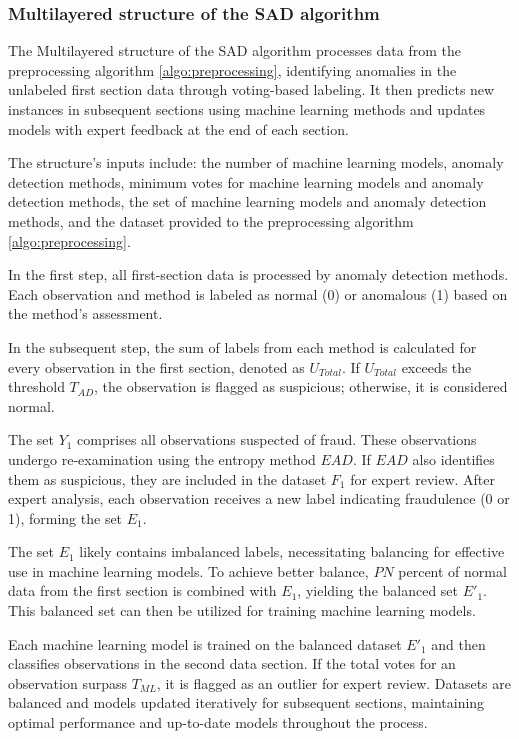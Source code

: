 \documentclass[12pt]{article}
\begin{document}
\subsubsection*{Multilayered structure of the SAD algorithm}
\label{sec4_3} The Multilayered structure of the SAD algorithm processes data from the
preprocessing algorithm \ref{algo:preprocessing}, identifying
anomalies in the unlabeled first section data through voting-based
labeling. It then predicts new instances in subsequent sections
using machine learning methods and updates models with expert
feedback at the end of each section.

The structure's inputs include: the number of machine learning
models, anomaly detection methods, minimum votes for machine
learning models and anomaly detection methods, the set of machine
learning models and anomaly detection methods, and the dataset
provided to the preprocessing algorithm \ref{algo:preprocessing}.

In the first step, all first-section data is processed by anomaly
detection methods. Each observation and method is labeled as
normal (0) or anomalous (1) based on the method's assessment.

In the subsequent step, the sum of labels from each method is
calculated for every observation in the first section, denoted as
$U_{Total}$. If $U_{Total}$ exceeds the threshold $T_{AD}$, the
observation is flagged as suspicious; otherwise, it is considered
normal.

The set $Y_1$ comprises all observations suspected of fraud. These
observations undergo re-examination using the entropy method
$EAD$. If $EAD$ also identifies them as suspicious, they are
included in the dataset $F_1$ for expert review. After expert
analysis, each observation receives a new label indicating
fraudulence (0 or 1), forming the set $E_1$.


The set $E_1$ likely contains imbalanced labels, necessitating
balancing for effective use in machine learning models. To achieve
better balance, $PN$ percent of normal data from the first section is
combined with $E_1$, yielding the balanced set $E'_1$. This
balanced set can then be utilized for training machine learning
models.

Each machine learning model is trained on the balanced dataset
$E'_1$ and then classifies observations in the second data section.
If the total votes for an observation surpass $T_{ML}$, it is
flagged as an outlier for expert review. Datasets are balanced and
models updated iteratively for subsequent sections, maintaining
optimal performance and up-to-date models throughout the process.
\end{document}
